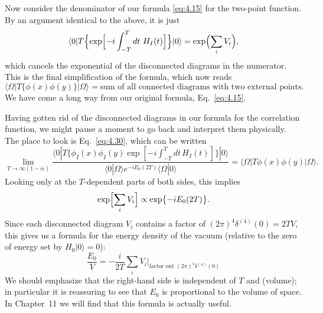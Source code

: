 Now consider the denominator of our formula \eqref{eq:4.15} for the two-point
function.  By an argument identical to the above, it is just
\begin{equation}
  \langle 0|T\Bigl\{ \exp\Bigl[ -i\int_{-T}^{T}dt\ H_I(t) \Bigr]
    \Bigr\}|0\rangle = \exp\Bigl( \sum_i V_i \Bigr) ,
\end{equation}
which cancels the exponential of the disconnected diagrams in the numerator.
This is the final simplification of the formula, which now reads
\begin{equation}
  \langle\Omega|T\{\phi(x)\phi(y)\}|\Omega\rangle
  = \text{sum of all connected diagrams with two external points} .
  \label{eq:4.54}
\end{equation}
We have come a long way from our original formula, Eq.~\eqref{eq:4.15}.

Having gotten rid of the disconnected diagrams in our formula for the
correlation function, we might pause a moment to go back and interpret them
physically.  The place to look is Eq.~\eqref{eq:4.30}, which can be written
\begin{equation}
  \lim_{T\to\infty(1-i\epsilon)}
    \frac{\langle 0|T\bigl\{ \phi_I(x)\phi_I(y)
      \exp[-i\int_{-T}^{T}dt\,H_I(t)]\bigr\}|0\rangle}
      {\langle 0|\Omega\rangle e^{-iE_0(2T)}\langle\Omega|0\rangle}
  = \langle\Omega|T\phi(x)\phi(y)|\Omega\rangle .
\end{equation}
Looking only at the $T$-dependent parts of both sides, this implies
\begin{equation}
  \exp\Bigl[ \sum_i V_i \Bigr] \propto \exp\bigl\{ -iE_0(2T) \bigr\} .
  \label{eq:4.55}
\end{equation}
Since each disconnected diagram $V_i$ contains a factor of
$(2\pi)^4\delta^{(4)}(0) = 2TV$, this gives us a formula for the energy
density of the vacuum (relative to the zero of energy set by
$H_0|0\rangle = 0$):
\begin{equation}
  \frac{E_0}{V} = -\frac{i}{2T}\sum_i V_i
    \Big|_{\text{factor out } (2\pi)^4\delta^{(4)}(0)}
  \label{eq:4.56}
\end{equation}
We should emphasize that the right-hand side is independent of $T$ and
(volume); in particular it is reassuring to see that $E_0$ is proportional to
the volume of space.  In Chapter~11 we will find that this formula is
actually useful.

